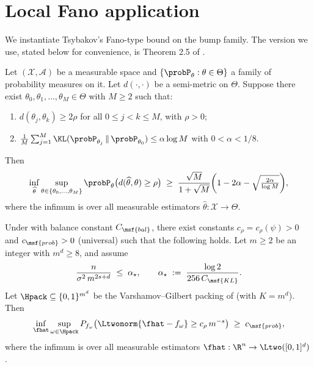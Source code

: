 \section{Local Fano application}\label{sec:fano-application}

We instantiate Tsybakov's Fano-type bound on the bump family. The version we use, stated below for convenience, is Theorem 2.5 of \cite{tsybakov2009introduction}.

\begin{lemma}\label{lem:fano-tsybakov}
Let $(\mathcal{X}, \mathcal{A})$ be a measurable space and $\{\probP_\theta : \theta \in \Theta\}$ a family of probability measures on it. Let $d(\cdot,\cdot)$ be a semi-metric on $\Theta$. Suppose there exist $\theta_0, \theta_1, \ldots, \theta_M \in \Theta$ with $M \geq 2$ such that:
\begin{enumerate}[label=(\roman*)]
\item\label{lem:fano-tsybakov:sep} $d(\theta_j, \theta_k) \geq 2\rho$ for all $0 \leq j < k \leq M$, with $\rho > 0$;
\item\label{lem:fano-tsybakov:kl} $\frac{1}{M} \sum_{j=1}^{M} \KL(\probP_{\theta_j} \,\|\, \probP_{\theta_0}) \leq \alpha \log M$ with $0 < \alpha < 1/8$.
\end{enumerate}
Then
\begin{align}\label{eq:fano-prob-bound}
\inf_{\widehat{\theta}} \sup_{\theta \in \{\theta_0,\ldots,\theta_M\}} \probP_\theta\bigl( d(\widehat{\theta}, \theta) \geq \rho \bigr)
\;\geq\; \frac{\sqrt{M}}{1 + \sqrt{M}} \biggl(1 - 2\alpha - \sqrt{\tfrac{2\alpha}{\log M}}\biggr),
\end{align}
where the infimum is over all measurable estimators $\widehat{\theta}: \mathcal{X} \to \Theta$.
\end{lemma}

\begin{lemma}\label{lem:prob-lb}
Under  with balance constant $C_{\msf{bal}}$, there exist constants $c_\rho = c_\rho(\psi) > 0$ and $c_{\msf{prob}} > 0$ (universal) such that the following holds. Let $m \geq 2$ be an integer with $m^d \geq 8$, and assume
\begin{align}\label{eq:m-condition}
\frac{n}{\sigma^2 \, m^{2s + d}} \;\leq\; \alpha_\star,
\qquad
\alpha_\star \;:=\; \frac{\log 2}{256 \, C_{\msf{KL}}}.
\end{align}
Let $\Hpack \subseteq \{0,1\}^{m^d}$ be the Varshamov--Gilbert packing of  (with $K = m^d$). Then
\begin{align}\label{eq:prob-lb}
\inf_{\fhat} \sup_{\omega \in \Hpack} P_{f_\omega}\bigl( \Ltwonorm{\fhat - f_\omega} \geq c_\rho \, m^{-s} \bigr)
\;\geq\; c_{\msf{prob}},
\end{align}
where the infimum is over all measurable estimators $\fhat: \R^n \to \Ltwo([0,1]^d)$.
\end{lemma}

